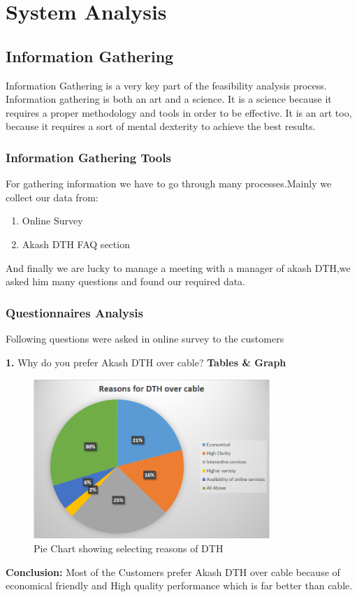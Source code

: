 \chapter{System Analysis}
\begin{spacing}{1}
\setlength{\parskip}{0.3in}
\graphicspath{{./Chapter3/}}

\section{Information Gathering}
Information Gathering is a very key part of the feasibility analysis process. Information gathering is both an art and a science. It is a science because it requires a proper methodology and tools in order to be effective. It is an art too, because it requires a sort of mental dexterity to achieve the best results.

\subsection{Information Gathering Tools}
For gathering information we have to go through many processes.Mainly we collect our data from:
\begin{enumerate}
\item Online Survey
\item Akash DTH FAQ section 
\end{enumerate}
And finally we are lucky to manage a meeting with a manager of akash DTH,we asked him many questions and found our required data.

\subsection{Questionnaires Analysis}
Following questions were asked in online survey to the customers 

{\bf 1.} Why do you prefer Akash DTH over cable?\newline
{\bf Tables \& Graph}
\begin{figure}[H]
	\centering
	\includegraphics[width=0.8\textwidth]{fig1}
	\caption{Pie Chart showing selecting reasons of DTH}
	\label{fig:PieChart1}
\end{figure}
{\bf Conclusion:}\newline
Most of the Customers prefer Akash DTH over cable because of economical friendly and High quality performance which is far better than cable.


\end{spacing}

